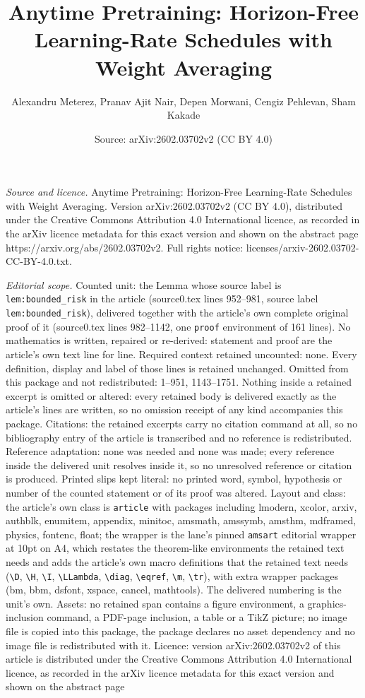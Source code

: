 \documentclass[10pt,a4paper]{amsart}
\title[Anytime Pretraining: Horizon-Free Learning-Rate Schedules wi]{Anytime Pretraining: Horizon-Free Learning-Rate Schedules with Weight Averaging}
\author{Alexandru Meterez, Pranav Ajit Nair, Depen Morwani, Cengiz Pehlevan, Sham Kakade}
\date{Source: arXiv:2602.03702v2 (CC BY 4.0)}
\begin{document}
\maketitle

\noindent\emph{Source and licence.} Anytime Pretraining: Horizon-Free Learning-Rate Schedules with Weight Averaging. Version arXiv:2602.03702v2 (CC BY 4.0), distributed under the Creative Commons Attribution 4.0 International licence, as recorded in the arXiv licence metadata for this exact version and shown on the abstract page https://arxiv.org/abs/2602.03702v2. Full rights notice: licenses/arxiv-2602.03702-CC-BY-4.0.txt.\par\smallskip

\noindent\textit{Editorial scope.} Counted unit: the Lemma whose source label is \texttt{lem:bounded\_risk} in the article (source0.tex lines 952--981, source label \texttt{lem:bounded\_risk}), delivered together with the article's own complete original proof of it (source0.tex lines 982--1142, one \texttt{proof} environment of 161 lines). No mathematics is written, repaired or re-derived: statement and proof are the article's own text line for line. Required context retained uncounted: none. Every definition, display and label of those lines is retained unchanged. Omitted from this package and not redistributed: 1--951, 1143--1751. Nothing inside a retained excerpt is omitted or altered: every retained body is delivered exactly as the article's lines are written, so no omission receipt of any kind accompanies this package. Citations: the retained excerpts carry no citation command at all, so no bibliography entry of the article is transcribed and no reference is redistributed. Reference adaptation: none was needed and none was made; every reference inside the delivered unit resolves inside it, so no unresolved reference or citation is produced. Printed slips kept literal: no printed word, symbol, hypothesis or number of the counted statement or of its proof was altered. Layout and class: the article's own class is \texttt{article} with packages including lmodern, xcolor, arxiv, authblk, enumitem, appendix, minitoc, amsmath, amssymb, amsthm, mdframed, physics, fontenc, float; the wrapper is the lane's pinned \texttt{amsart} editorial wrapper at 10pt on A4, which restates the theorem-like environments the retained text needs and adds the article's own macro definitions that the retained text needs (\texttt{\textbackslash D}, \texttt{\textbackslash H}, \texttt{\textbackslash I}, \texttt{\textbackslash LLambda}, \texttt{\textbackslash diag}, \texttt{\textbackslash eqref}, \texttt{\textbackslash m}, \texttt{\textbackslash tr}), with extra wrapper packages (bm, bbm, dsfont, xspace, cancel, mathtools). The delivered numbering is the unit's own. Assets: no retained span contains a figure environment, a graphics-inclusion command, a PDF-page inclusion, a table or a TikZ picture; no image file is copied into this package, the package declares no asset dependency and no image file is redistributed with it. Licence: version arXiv:2602.03702v2 of this article is distributed under the Creative Commons Attribution 4.0 International licence, as recorded in the arXiv licence metadata for this exact version and shown on the abstract page 
\end{document}
